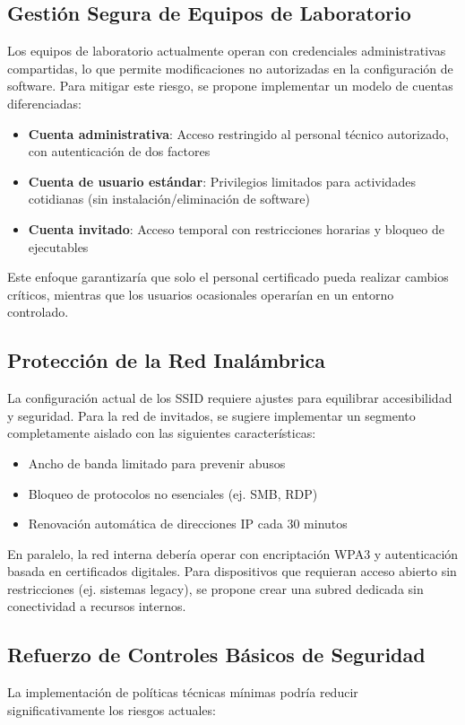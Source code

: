 \subsection*{Gestión Segura de Equipos de Laboratorio}
Los equipos de laboratorio actualmente operan con credenciales administrativas compartidas, lo que permite modificaciones no autorizadas en la configuración de software. Para mitigar este riesgo, se propone implementar un modelo de cuentas diferenciadas:

\begin{itemize}
	\item \textbf{Cuenta administrativa}: Acceso restringido al personal técnico autorizado, con autenticación de dos factores
	\item \textbf{Cuenta de usuario estándar}: Privilegios limitados para actividades cotidianas (sin instalación/eliminación de software)
	\item \textbf{Cuenta invitado}: Acceso temporal con restricciones horarias y bloqueo de ejecutables
\end{itemize}

Este enfoque garantizaría que solo el personal certificado pueda realizar cambios críticos, mientras que los usuarios ocasionales operarían en un entorno controlado.

\subsection*{Protección de la Red Inalámbrica}
La configuración actual de los SSID requiere ajustes para equilibrar accesibilidad y seguridad. Para la red de invitados, se sugiere implementar un segmento completamente aislado con las siguientes características:

\begin{itemize}
	\item Ancho de banda limitado para prevenir abusos
	\item Bloqueo de protocolos no esenciales (ej. SMB, RDP)
	\item Renovación automática de direcciones IP cada 30 minutos
\end{itemize}

En paralelo, la red interna debería operar con encriptación WPA3 y autenticación basada en certificados digitales. Para dispositivos que requieran acceso abierto sin restricciones (ej. sistemas legacy), se propone crear una subred dedicada sin conectividad a recursos internos.

\subsection*{Refuerzo de Controles Básicos de Seguridad}
La implementación de políticas técnicas mínimas podría reducir significativamente los riesgos actuales:

